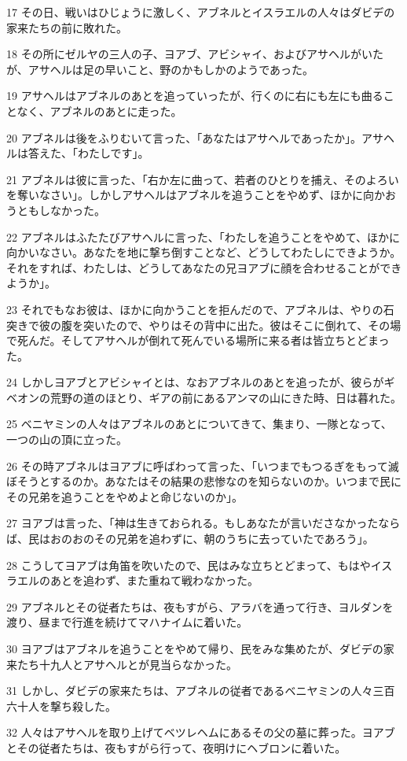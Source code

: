 \par 17 その日、戦いはひじょうに激しく、アブネルとイスラエルの人々はダビデの家来たちの前に敗れた。
\par 18 その所にゼルヤの三人の子、ヨアブ、アビシャイ、およびアサヘルがいたが、アサヘルは足の早いこと、野のかもしかのようであった。
\par 19 アサヘルはアブネルのあとを追っていったが、行くのに右にも左にも曲ることなく、アブネルのあとに走った。
\par 20 アブネルは後をふりむいて言った、「あなたはアサヘルであったか」。アサヘルは答えた、「わたしです」。
\par 21 アブネルは彼に言った、「右か左に曲って、若者のひとりを捕え、そのよろいを奪いなさい」。しかしアサヘルはアブネルを追うことをやめず、ほかに向かおうともしなかった。
\par 22 アブネルはふたたびアサヘルに言った、「わたしを追うことをやめて、ほかに向かいなさい。あなたを地に撃ち倒すことなど、どうしてわたしにできようか。それをすれば、わたしは、どうしてあなたの兄ヨアブに顔を合わせることができようか」。
\par 23 それでもなお彼は、ほかに向かうことを拒んだので、アブネルは、やりの石突きで彼の腹を突いたので、やりはその背中に出た。彼はそこに倒れて、その場で死んだ。そしてアサヘルが倒れて死んでいる場所に来る者は皆立ちとどまった。
\par 24 しかしヨアブとアビシャイとは、なおアブネルのあとを追ったが、彼らがギベオンの荒野の道のほとり、ギアの前にあるアンマの山にきた時、日は暮れた。
\par 25 ベニヤミンの人々はアブネルのあとについてきて、集まり、一隊となって、一つの山の頂に立った。
\par 26 その時アブネルはヨアブに呼ばわって言った、「いつまでもつるぎをもって滅ぼそうとするのか。あなたはその結果の悲惨なのを知らないのか。いつまで民にその兄弟を追うことをやめよと命じないのか」。
\par 27 ヨアブは言った、「神は生きておられる。もしあなたが言いださなかったならば、民はおのおのその兄弟を追わずに、朝のうちに去っていたであろう」。
\par 28 こうしてヨアブは角笛を吹いたので、民はみな立ちとどまって、もはやイスラエルのあとを追わず、また重ねて戦わなかった。
\par 29 アブネルとその従者たちは、夜もすがら、アラバを通って行き、ヨルダンを渡り、昼まで行進を続けてマハナイムに着いた。
\par 30 ヨアブはアブネルを追うことをやめて帰り、民をみな集めたが、ダビデの家来たち十九人とアサヘルとが見当らなかった。
\par 31 しかし、ダビデの家来たちは、アブネルの従者であるベニヤミンの人々三百六十人を撃ち殺した。
\par 32 人々はアサヘルを取り上げてベツレヘムにあるその父の墓に葬った。ヨアブとその従者たちは、夜もすがら行って、夜明けにヘブロンに着いた。

